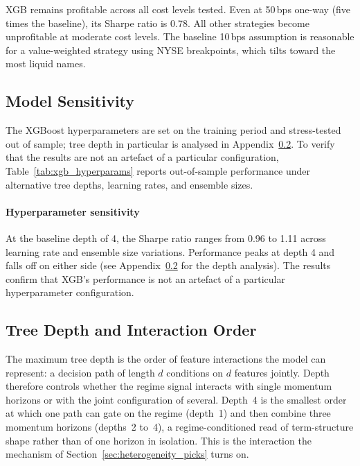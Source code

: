 

XGB remains profitable across all cost levels tested. Even at 50\,bps one-way (five times the baseline), its Sharpe ratio is 0.78. All other strategies become unprofitable at moderate cost levels. The baseline 10\,bps assumption is reasonable for a value-weighted strategy using NYSE breakpoints, which tilts toward the most liquid names.

\subsection{Model Sensitivity}\label{app:xgb_sensitivity}

The XGBoost hyperparameters are set on the training period and stress-tested out of sample; tree depth in particular is analysed in Appendix~\ref{app:depth_selection}. To verify that the results are not an artefact of a particular configuration, Table~\ref{tab:xgb_hyperparams} reports out-of-sample performance under alternative tree depths, learning rates, and ensemble sizes.



\paragraph{Hyperparameter sensitivity}
At the baseline depth of 4, the Sharpe ratio ranges from 0.96 to 1.11 across learning rate and ensemble size variations. Performance peaks at depth 4 and falls off on either side (see Appendix~\ref{app:depth_selection} for the depth analysis). The results confirm that XGB's performance is not an artefact of a particular hyperparameter configuration.

\subsection{Tree Depth and Interaction Order}\label{app:depth_selection}

The maximum tree depth is the order of feature interactions the model can represent: a decision path of length $d$ conditions on $d$ features jointly. Depth therefore controls whether the regime signal interacts with single momentum horizons or with the joint configuration of several. Depth~4 is the smallest order at which one path can gate on the regime (depth~1) and then combine three momentum horizons (depths~2 to~4), a regime-conditioned read of term-structure shape rather than of one horizon in isolation. This is the interaction the mechanism of Section~\ref{sec:heterogeneity_picks} turns on.

